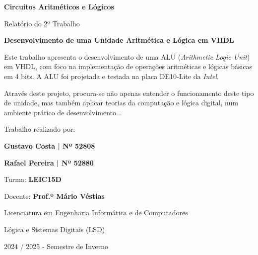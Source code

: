 
\begin{titlepage}  
    \begin{center}
    
        \vspace*{\fill}   
        
        \huge \textbf{Circuitos Aritméticos e Lógicos}
        
        \large Relatório do 2º Trabalho
        \vspace{1.25in}
        
        \normalsize
        
        \textbf{Desenvolvimento de uma Unidade Aritmética e Lógica em VHDL}
        \vspace{5mm}

        Este trabalho apresenta o desenvolvimento de uma ALU (\textit{Arithmetic Logic Unit}) em VHDL, com foco na implementação de operações aritméticas e lógicas básicas em 4 bits. A ALU foi projetada e testada na placa DE10-Lite da \textit{Intel}.
        \vspace{5mm}

        Através deste projeto, procura-se não apenas entender o funcionamento deste tipo de unidade, mas também aplicar teorias da computação e lógica digital, num ambiente prático de desenvolvimento...
        \vspace{1in}
        
        Trabalho realizado por: 
        
        \textbf{Gustavo Costa | Nº 52808}
        
        \textbf{Rafael Pereira | Nº 52880}
        \vspace{1in}
        
        Turma: \textbf{LEIC15D}
        
        Docente: \textbf{Prof.º Mário Véstias}
        \vspace{1.25in}
        
        Licenciatura em Engenharia Informática e de Computadores
        
        Lógica e Sistemas Digitais (LSD)
        
        2024 / 2025 - Semestre de Inverno
        
        \vspace*{\fill}%
        
    \end{center}
\end{titlepage}